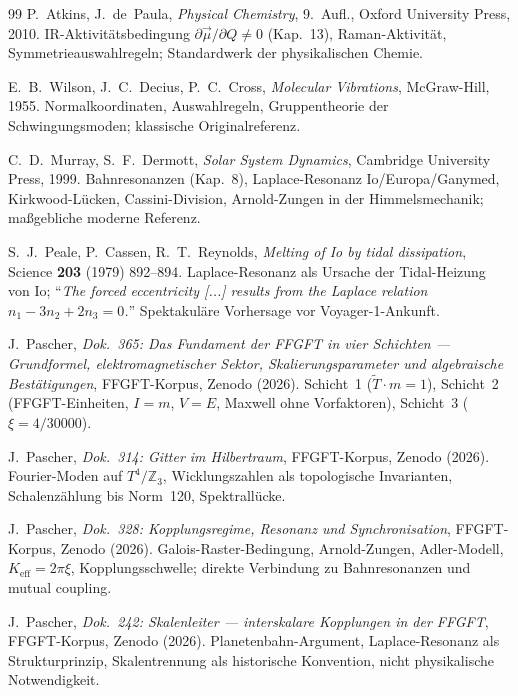 \begin{thebibliography}{99}
P.~Atkins, J.~de~Paula,
\textit{Physical Chemistry},
9.~Aufl., Oxford University Press, 2010.
IR-Aktivitätsbedingung $\partial\vec{\mu}/\partial Q\neq0$ (Kap.~13),
Raman-Aktivität, Symmetrieauswahlregeln; Standardwerk der physikalischen Chemie.

E.~B.~Wilson, J.~C.~Decius, P.~C.~Cross,
\textit{Molecular Vibrations},
McGraw-Hill, 1955.
Normalkoordinaten, Auswahlregeln, Gruppentheorie der Schwingungsmoden;
klassische Originalreferenz.


C.~D.~Murray, S.~F.~Dermott,
\textit{Solar System Dynamics},
Cambridge University Press, 1999.
Bahnresonanzen (Kap.~8), Laplace-Resonanz Io/Europa/Ganymed,
Kirkwood-Lücken, Cassini-Division, Arnold-Zungen in der
Himmelsmechanik; maßgebliche moderne Referenz.

S.~J.~Peale, P.~Cassen, R.~T.~Reynolds,
\textit{Melting of Io by tidal dissipation},
Science \textbf{203} (1979) 892--894.
Laplace-Resonanz als Ursache der Tidal-Heizung von Io;
``\textit{The forced eccentricity [...] results from the Laplace relation
$n_1 - 3n_2 + 2n_3 = 0$.}'' Spektakuläre Vorhersage vor Voyager-1-Ankunft.


J.~Pascher,
\textit{Dok.~365: Das Fundament der FFGFT in vier Schichten ---
Grundformel, elektromagnetischer Sektor, Skalierungsparameter und
algebraische Bestätigungen},
FFGFT-Korpus, Zenodo (2026).
Schicht~1 ($\tilde{T}\cdot m=1$), Schicht~2 (FFGFT-Einheiten,
$I=m$, $V=E$, Maxwell ohne Vorfaktoren), Schicht~3 ($\xi=4/30000$).

J.~Pascher,
\textit{Dok.~314: Gitter im Hilbertraum},
FFGFT-Korpus, Zenodo (2026).
Fourier-Moden auf $T^4/\mathbb{Z}_3$, Wicklungszahlen als topologische
Invarianten, Schalenzählung bis Norm~120, Spektrallücke.

J.~Pascher,
\textit{Dok.~328: Kopplungsregime, Resonanz und Synchronisation},
FFGFT-Korpus, Zenodo (2026).
Galois-Raster-Bedingung, Arnold-Zungen, Adler-Modell, $K_\mathrm{eff}=2\pi\xi$,
Kopplungsschwelle; direkte Verbindung zu Bahnresonanzen und mutual coupling.

J.~Pascher,
\textit{Dok.~242: Skalenleiter --- interskalare Kopplungen in der FFGFT},
FFGFT-Korpus, Zenodo (2026).
Planetenbahn-Argument, Laplace-Resonanz als Strukturprinzip,
Skalentrennung als historische Konvention, nicht physikalische Notwendigkeit.


\end{thebibliography}
